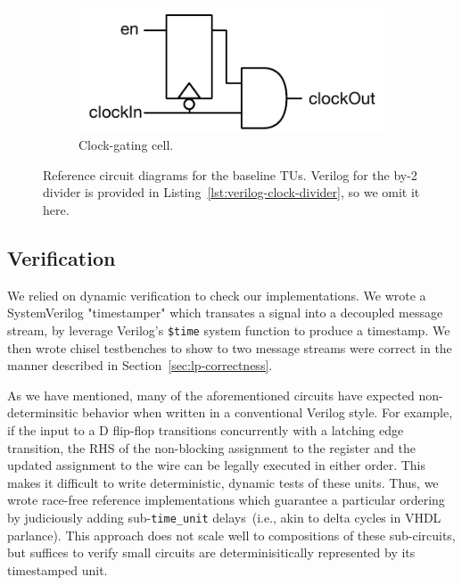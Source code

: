 \begin{figure}
\begin{subfigure}[t]{0.40\textwidth}
    \end{subfigure}
    \hspace{-1cm}
    \begin{subfigure}[t]{0.30\textwidth}
        \captionsetup{margin=0.25cm}
        \includegraphics[width=\columnwidth]{figures/clock-gate.pdf}
        \caption{Clock-gating cell.}
        \label{fig:clock-gate}
    \end{subfigure}
    \centering
    \caption{Reference circuit diagrams for the baseline TUs. Verilog for the
    by-2 divider is provided in Listing~\ref{lst:verilog-clock-divider}, so we
    omit it here.}
    \label{fig:baseline-reference-circuits}
\end{figure}

\subsection{Verification}

We relied on dynamic verification to check our implementations. We
wrote a SystemVerilog "timestamper" which transates a signal into a decoupled
message stream, by leverage Verilog's \texttt{\$time} system function to
produce a timestamp. We then wrote chisel testbenches to show to two message
streams were correct in the manner described in
Section~\ref{sec:lp-correctness}.

As we have mentioned, many of the aforementioned circuits have expected
non-determinsitic behavior when written in a conventional Verilog style. For
example, if the input to a D flip-flop transitions concurrently with a latching
edge transition, the RHS of the non-blocking assignment to the register and the updated
assignment to the wire can be legally executed in either order. This makes it difficult to write
deterministic, dynamic tests of these units. Thus, we wrote race-free
reference implementations which guarantee a particular ordering by judiciously adding sub-\texttt{time\_unit}
delays~(i.e., akin to delta cycles in VHDL parlance). This approach does not scale well to
compositions of these sub-circuits, but suffices to verify small circuits are
determinisitically represented by its timestamped unit.

